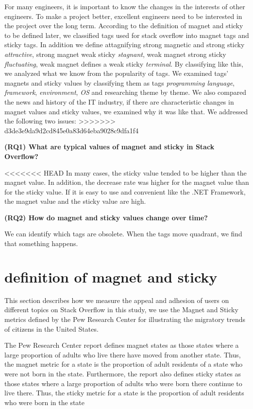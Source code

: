 \documentclass[conference]{IEEEtran}
\begin{document}
\smallskip
For many engineers, it is important to know the changes in the interests of other engineers. To make a project better, excellent engineers need to be interested in the project over the long term. According to the definition of magnet and sticky to be defined later, we classified tags used for stack overflow into magnet tags and sticky tags. In addition we define attagnifying strong magnetic and strong sticky \emph{attractive}, strong magnet weak sticky \emph{stagnant}, weak magnet strong sticky \emph{fluctuating}, weak magnet defines a weak sticky \emph{terminal}. By classifying like this, we analyzed what we know from the popularity of tags. We examined tags' magnets and sticky values by classifying them as tags \emph{programming language}, \emph{framework}, \emph{environment}, \emph{OS} and researching theme by theme. We also compared the news and history of the IT industry, if there are characteristic changes in magnet values and sticky values, we examined why it was like that. We addressed the following two issues:
>>>>>>> d3de3e9da9d2cd845e0a83d64eba9028c9dfa1f4
\par
\smallskip

\textbf{(RQ1) What are typical values of magnet and sticky in Stack Overflow?}\par
<<<<<<< HEAD
In many cases, the sticky value tended to be higher than the magnet value. In addition, the decrease rate was higher for the magnet value than for the sticky value. If it is easy to use and convenient like the .NET Framework, the magnet value and the sticky value are high.
\smallskip

\textbf{(RQ2) How do magnet and sticky values change over time?}\par
We can identify which tags are obsolete. When the tags move quadrant, we find that something happens.



\section{definition of magnet and sticky}
This section describes how we measure the appeal and adhesion of users on different topics on Stack Overflow in this study, we use the Magnet and Sticky metrics defined by the Pew Research Center for illustrating the migratory trends of citizens in the United States.

The Pew Research Center report defines magnet states as those states where a large proportion of adults who live there have moved from another state. Thus, the magnet metric for a state is the proportion of adult residents of a state who were not born in the state. Furthermore, the report also defines sticky states as those states where a large proportion of adults who were born there continue to live there. Thus, the sticky metric for a state is the proportion of adult residents who were born in the state
\end{document}
